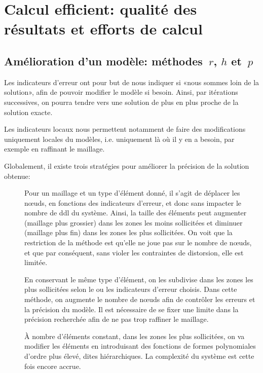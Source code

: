 \chapter{Calcul efficient: qualité des résultats et efforts de calcul}\label{Ch-Amelio}


\medskip
\section{Amélioration d'un modèle: méthodes~$r$, $h$ et~$p$}\label{Sec-rhp}

Les indicateurs d'erreur ont pour but de nous indiquer si «nous sommes loin de
la solution», afin de pouvoir modifier le modèle si besoin.
Ainsi, par itérations successives, on pourra tendre vers une solution
de plus en plus proche de la solution exacte.

Les indicateurs locaux nous permettent notamment de faire des modifications uniquement
locales du modèles, i.e. uniquement là où il y en a besoin, par exemple en
raffinant le maillage.

\medskip
Globalement, il existe trois stratégies pour améliorer la précision de la
solution obtenue:
\begin{description}
\item[] Pour un maillage et un type d'élément donné, il s'agit de déplacer les nœuds, en fonctions des indicateurs d'erreur, et donc sans impacter le nombre de ddl du système. Ainsi, la taille des éléments peut augmenter (maillage plus grossier) dans les zones les moins sollicitées et diminuer (maillage plus fin) dans les zones les plus sollicitées. On voit que la restriction de la méthode est qu'elle ne joue pas sur le nombre de nœuds, et que par conséquent, sans violer les contraintes de distorsion, elle est limitée.
\item[] En conservant le même type d'élément, on les subdivise dans les zones les plus sollicitées selon le ou les indicateurs d'erreur choisis. Dans cette méthode, on augmente le nombre de nœuds afin de contrôler les erreurs et la précision du modèle. Il est nécessaire de se fixer une limite dans la précision recherchée afin de ne pas trop raffiner le maillage.
\item[] À nombre d'éléments constant, dans les zones les plus sollicitées, on va modifier les éléments en introduisant des fonctions de formes polynomiales d'ordre plus élevé, dites hiérarchiques. La complexité du système est cette fois encore accrue.
\end{description}

